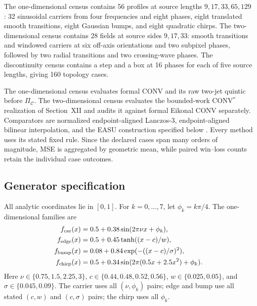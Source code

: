 \documentclass[journal]{IEEEtran}
\begin{document}
The one-dimensional census contains 56 profiles at source lengths
$9,17,33,65,129$: 32 sinusoidal carriers from four frequencies and eight
phases, eight translated smooth transitions, eight Gaussian bumps, and eight
quadratic chirps. The two-dimensional census contains 28 fields at source
sides $9,17,33$: smooth transitions and windowed carriers at six off-axis
orientations and two subpixel phases, followed by two radial transitions and
two crossing-wave phases. The discontinuity census contains a step and a box
at 16 phases for each of five source lengths, giving 160 topology cases.

The one-dimensional census evaluates formal CONV and its raw two-jet
quintic before \(\Pi_{\mathcal C}\). The two-dimensional census evaluates
the bounded-work CONV$^{*}$ realization of Section~XII and audits it against
formal Eikonal CONV separately. Comparators are normalized endpoint-aligned
Lanczos-3, endpoint-aligned bilinear interpolation, and the EASU construction
specified below \cite{lanczos1956,lottes2021}. Every method uses its stated
fixed rule. Since the declared cases span many orders of magnitude, MSE is
aggregated by geometric mean, while paired win--loss counts retain the
individual case outcomes.

\subsection{Generator specification}

All analytic coordinates lie in \([0,1]\). For \(k=0,\ldots,7\), let
\(\phi_k=k\pi/4\). The one-dimensional families are
\begin{align}
 f_{\rm car}(x)&=0.5+0.38\sin(2\pi\nu x+\phi_k),\nonumber\\
 f_{\rm edge}(x)&=0.5+0.45\tanh((x-c)/w),\nonumber\\
 f_{\rm bump}(x)&=0.08+0.84\exp(-((x-c)/\sigma)^2),\nonumber\\
 f_{\rm chirp}(x)&=0.5+0.34\sin(2\pi(0.5x+2.5x^2)+\phi_k).
 \label{eq:onedgenerators}
\end{align}
Here \(\nu\in\{0.75,1.5,2.25,3\}\),
\(c\in\{0.44,0.48,0.52,0.56\}\),
\(w\in\{0.025,0.05\}\), and
\(\sigma\in\{0.045,0.09\}\). The carrier uses all \((\nu,\phi_k)\)
pairs; edge and bump use all stated \((c,w)\) and \((c,\sigma)\) pairs;
the chirp uses all \(\phi_k\).
\end{document}
